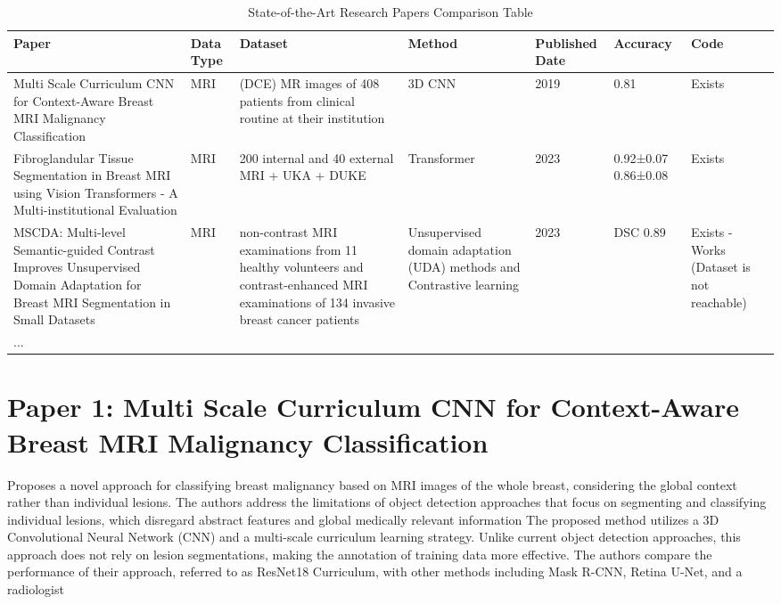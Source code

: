 \documentclass{article}
\begin{document}
\begin{table}[htbp]
    \caption{State-of-the-Art Research Papers Comparison Table}
    \label{tab:comparison}
    \begin{tabular}{p{4cm} p{0.75cm} p{4cm} p{2cm} p{1.5cm} p{1.5cm} p{1.5cm}}
        \toprule
        \textbf{Paper} & \textbf{Data Type} & \textbf{Dataset} & \textbf{Method} & \textbf{Published Date} & \textbf{Accuracy} & \textbf{Code} \\
        \midrule
        Multi Scale Curriculum CNN for Context-Aware Breast MRI Malignancy Classification & MRI & (DCE) MR images of 408 patients from clinical routine at their institution & 3D CNN & 2019 & 0.81 & Exists \\
        Fibroglandular Tissue Segmentation in Breast MRI using Vision Transformers - A Multi-institutional Evaluation & MRI & 200 internal and 40 external MRI + UKA + DUKE & Transformer & 2023 & 0.92±0.07 0.86±0.08 & Exists \\
        MSCDA: Multi-level Semantic-guided Contrast
Improves Unsupervised Domain Adaptation for Breast
MRI Segmentation in Small Datasets & MRI & non-contrast MRI examinations from 11 healthy volunteers and contrast-enhanced MRI examinations of 134 invasive breast cancer patients & Unsupervised domain adaptation (UDA) methods and Contrastive learning & 2023 & DSC 0.89 & Exists - Works (Dataset is not reachable) \\
        ... \\
        \bottomrule
    \end{tabular}
\end{table}



\section{Paper 1: Multi Scale Curriculum CNN for Context-Aware Breast MRI Malignancy Classification}
Proposes a novel approach for classifying breast malignancy based on MRI images of the whole breast, considering the global context rather than individual lesions. The authors address the limitations of object detection approaches that focus on segmenting and classifying individual lesions, which disregard abstract features and global medically relevant information
The proposed method utilizes a 3D Convolutional Neural Network (CNN) and a multi-scale curriculum learning strategy. Unlike current object detection approaches, this approach does not rely on lesion segmentations, making the annotation of training data more effective. The authors compare the performance of their approach, referred to as ResNet18 Curriculum, with other methods including Mask R-CNN, Retina U-Net, and a radiologist
\end{document}
